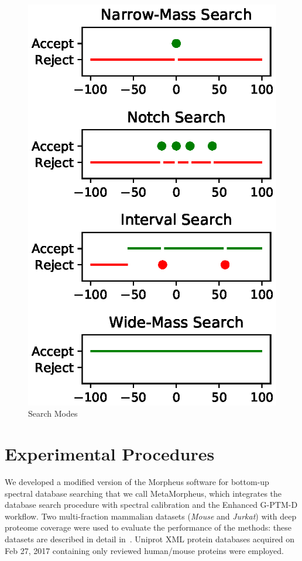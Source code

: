 \documentclass[journal=jprobs,manuscript=article]{achemso}
\begin{document}
\begin{figure}
  \includegraphics{figureDifferentSearchModes.eps}
  \caption{Search Modes}
  \label{fgr:differentSearchModes}
\end{figure}

\section{Experimental Procedures}
We developed a modified version of the Morpheus software for bottom-up spectral database searching\cite{Wenger_2013} that we call MetaMorpheus, which integrates the database search procedure with spectral calibration and the Enhanced G-PTM-D workflow.
Two multi-fraction mammalian datasets (\textit{Mouse} and \textit{Jurkat}) with deep proteome coverage were used to evaluate the performance of the methods: these datasets are described in detail in~\cite{Shortreed_2015, Cesnik_2016}.
Uniprot XML protein databases acquired on Feb 27, 2017 containing only reviewed human/mouse proteins were employed. 
\end{document}
